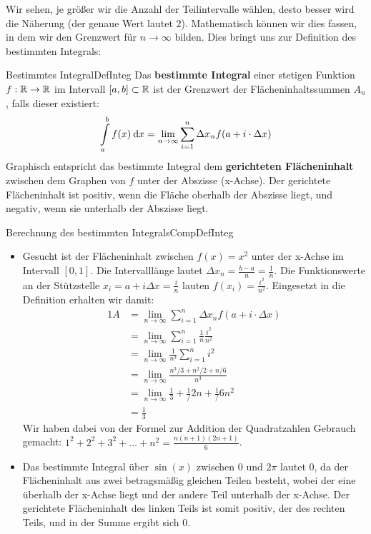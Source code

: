 Wir sehen, je größer wir die Anzahl der Teilintervalle wählen, desto besser wird die Näherung (der genaue Wert lautet $2$). Mathematisch können wir dies fassen, in dem wir den Grenzwert für $n \to \infty$ bilden. Dies bringt uns zur Definition des bestimmten Integrals:

\begin{definition}{Bestimmtes Integral}{DefInteg}
    Das \textbf{bestimmte Integral} einer stetigen Funktion $f: \mathbb{R} \to \mathbb{R}$ im Intervall $[a,b] \subset \mathbb{R}$ ist der Grenzwert der Flächeninhaltssummen $A_n$, falls dieser existiert:
    $$
        \int\limits_{a}^b f(x) \:\mathrm{d}{x} = \lim\limits_{n\to\infty} \sum_{i=1}^{n} \Delta x_n f(a + i\cdot\Delta x)
    $$
    Graphisch entspricht das bestimmte Integral dem \textbf{gerichteten Flächeninhalt} zwischen dem Graphen von $f$ unter der Abszisse (x-Achse). Der gerichtete Flächeninhalt ist positiv, wenn die Fläche oberhalb der Abszisse liegt, und negativ, wenn sie unterhalb der Abszisse liegt.
\end{definition}

\begin{example}{Berechnung des bestimmten Integrals}{CompDefInteg}
    \begin{itemize}
        \item Gesucht ist der Flächeninhalt zwischen $f(x) = x^2$ unter der x-Achse im Intervall $[0,1]$. Die Intervalllänge lautet $\Delta x_n = \frac{b-a}{n} = \frac{1}{n}$. Die Funktionswerte an der Stützstelle $x_i = a + i \Delta x = \frac{i}{n}$ lauten $f(x_i) = \frac{i^2}{n^2}$. Eingesetzt in die Definition erhalten wir damit:
        \begin{alignat*}{1}
            A &= \lim\limits_{n\to\infty} \sum_{i=1}^{n} \Delta x_n f(a + i\cdot\Delta x) \\
              &= \lim\limits_{n\to\infty} \sum_{i=1}^{n} \frac{1}{n} \frac{i^2}{n^2} \\
              &= \lim\limits_{n\to\infty} \frac{1}{n^3} \sum_{i=1}^{n} i^2 \\
              &= \lim\limits_{n\to\infty} \frac{n^3/3+n^2/2+n/6}{n^3} \\
              &= \lim\limits_{n\to\infty} \frac{1}{3} + \frac{1}/{2n} + \frac{1}/{6n^2} \\
              &= \frac{1}{3}
        \end{alignat*}
        Wir haben dabei von der Formel zur Addition der Quadratzahlen Gebrauch gemacht: $1^2 + 2^2 + 3^2 + \dots + n^2 = \frac{n (n+1) (2n+1)}{6}$.
        \item Das bestimmte Integral über $\sin(x)$ zwischen $0$ und $2\pi$ lautet $0$, da der Flächeninhalt aus zwei betragsmäßig gleichen Teilen besteht, wobei der eine überhalb der x-Achse liegt und der andere Teil unterhalb der x-Achse. Der gerichtete Flächeninhalt des linken Teils ist somit positiv, der des rechten Teils, und in der Summe ergibt sich $0$.
    \end{itemize}
\end{example}

